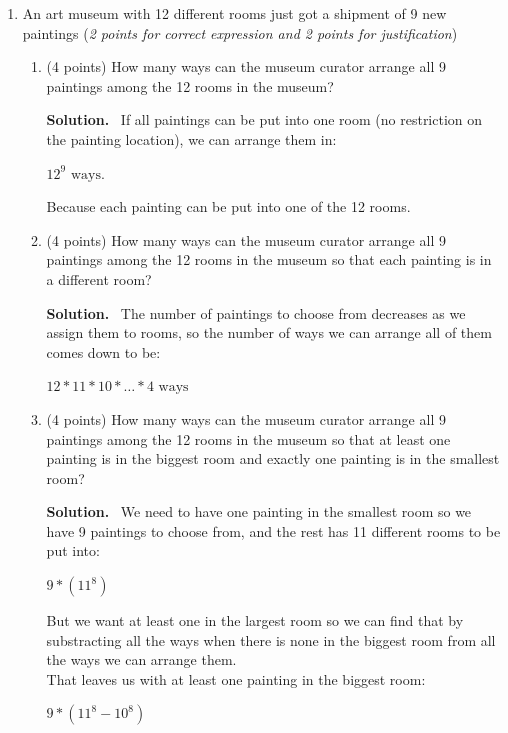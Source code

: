 \documentclass[10pt,letterpaper]{article}
\newenvironment{solution}
  {\par\noindent\textbf{Solution.}\ }
  {\par}
\begin{document}
\begin{enumerate}
\begin{enumerate}
\begin{solution}
    Thus the answer is 

    \[\binom{26}{7}\]
    
\end{solution}
\end{enumerate}

\item
An art museum with 12 different rooms just got a shipment of 9 new paintings (\emph{2 points for correct expression and 2 points for justification})
\begin{enumerate}
\item
(4 points)
How many ways can the museum curator arrange all 9 paintings among the 12 rooms in the museum?

\begin{solution}
  If all paintings can be put into one room (no restriction on the painting location), we can arrange them in:
  \begin{center}
    $\boxed{12^9 \text{ ways.}}$
  \end{center}
  Because each painting can be put into one of the 12 rooms.
\end{solution}

\item
(4 points)
How many ways can the museum curator arrange all 9 paintings among the 12 rooms in the museum so that each painting is in a different room?

\begin{solution}
   The number of paintings to choose from decreases as we assign them to rooms, so the number of ways we can arrange all of them comes down to be:
  \begin{center}
    $\boxed{12*11*10*\dots*4\text{ ways}}$
  \end{center}
\end{solution}

\item
(4 points)
How many ways can the museum curator arrange all 9 paintings among the 12 rooms in the museum so that at least one painting is in the biggest room and exactly one painting is in the smallest room?

\begin{solution}
  We need to have one painting in the smallest room so we have 9 paintings to choose from, and the rest has 11 different rooms to be put into:
  \begin{center}
    $9*(11^8)$
  \end{center}
  But we want at least one in the largest room so we can find that by substracting all the ways when there is none in the biggest room from all the ways we can arrange them.\\
  That leaves us with at least one painting in the biggest room:
  \begin{center}
    $\boxed{9*(11^8 - 10^8)}$
  \end{center}
\end{solution}


\end{enumerate}
\end{enumerate}
\end{document}
